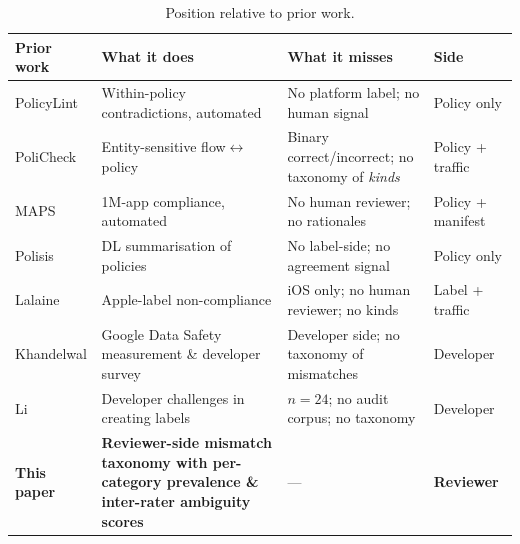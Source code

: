 \documentclass[11pt,a4paper]{article}
\begin{document}
\begin{table}[t]
\centering\footnotesize
\caption{Position relative to prior work.}\label{tab:novelty}
\renewcommand{\arraystretch}{1.18}
\setlength{\tabcolsep}{4pt}
\begin{tabular}{@{}p{2.8cm}p{4.0cm}p{5.2cm}p{2.6cm}@{}}
\toprule
\textbf{Prior work} & \textbf{What it does} & \textbf{What it misses} & \textbf{Side} \\
\midrule
PolicyLint \citep{andow2019policylint} & Within-policy contradictions, automated & No platform label; no human signal & Policy only \\
PoliCheck \citep{andow2020policheck} & Entity-sensitive flow$\leftrightarrow$policy & Binary correct/incorrect; no taxonomy of \emph{kinds} & Policy + traffic \\
MAPS \citep{zimmeck2019maps} & 1M-app compliance, automated & No human reviewer; no rationales & Policy + manifest \\
Polisis \citep{harkous2018polisis} & DL summarisation of policies & No label-side; no agreement signal & Policy only \\
Lalaine \citep{xiao2023lalaine} & Apple-label non-compliance & iOS only; no human reviewer; no kinds & Label + traffic \\
Khandelwal \citep{khandelwal2024unpacking} & Google Data Safety measurement \& developer survey & Developer side; no taxonomy of mismatches & Developer \\
Li \citep{li2022understanding} & Developer challenges in creating labels & $n=24$; no audit corpus; no taxonomy & Developer \\
\midrule
\textbf{This paper} &
\textbf{Reviewer-side mismatch taxonomy with per-category prevalence \& inter-rater ambiguity scores} &
--- & \textbf{Reviewer} \\
\bottomrule
\end{tabular}
\end{table}
\end{document}
